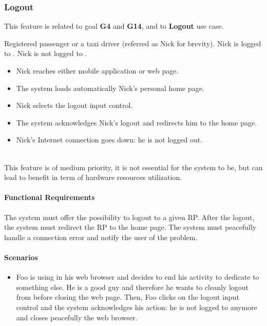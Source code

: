 \subsubsection{Logout}
This feature is related to goal \textbf{G4} and \textbf{G14}, and to \textbf{Logout} use case.
\begin{itemize}
	 Registered passenger or a taxi driver (referred as Nick for brevity).
	 Nick is logged to \myTaxiService{}.
	 Nick is not logged to \myTaxiService{}.
	\begin{itemize}
		\item Nick reaches either \myTaxiService{} mobile application or web page.
		\item The system loads automatically Nick's personal home page.
		\item Nick selects the logout input control.
		\item The system acknowledges Nick's logout and redirects him to the home page.
	\end{itemize}
	\begin{itemize}
		\item Nick's Internet connection goes down: he is not logged out.
	\end{itemize}
\end{itemize}
\\
This feature is of medium priority, it is not essential for the system to be, but can lead to benefit in term of hardware resources utilization.\par
\paragraph{Functional Requirements}
\begin{itemize}
	 The system must offer the possibility to logout to a given RP.
	 After the logout, the system must redirect the RP to the \myTaxiService{} home page.
	 The system must peacefully handle a connection error and notify the user of the problem.
\end{itemize}
\paragraph{Scenarios}
\begin{itemize}
	\item Foo is using \myTaxiService{} in his web browser and decides to end his activity to dedicate to something else.
	He is a good guy and therefore he wants to cleanly logout from \myTaxiService{} before closing the web page.
	Then, Foo clicks on the logout input control and the system acknowledges his action: he is not logged to \myTaxiService{} anymore and closes peacefully the web browser.
\end{itemize}
